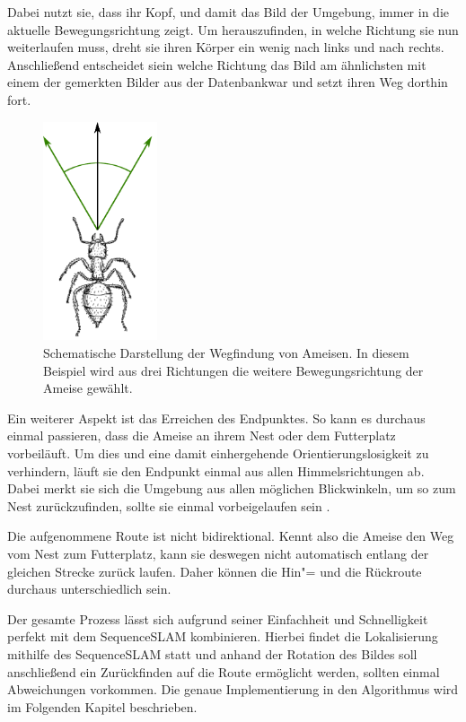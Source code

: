 \documentclass[12pt,a4paper,titlepage]{scrartcl}
\begin{document}
Dabei nutzt sie, dass ihr Kopf, und damit das Bild der Umgebung, immer in die aktuelle Bewegungsrichtung zeigt. Um herauszufinden, in welche Richtung sie nun weiterlaufen muss, dreht sie ihren Körper ein wenig nach links und nach rechts. Anschließend entscheidet siein welche Richtung das Bild am ähnlichsten mit einem der gemerkten Bilder aus der \glqq Datenbank\grqq{ }war und setzt ihren Weg dorthin fort. 
\begin{figure}[h!]
\centering
\includegraphics[width=0.3\textwidth]{../Bilder/blickwinkel_aenderung.pdf}
\caption[Wegfindung der Ameise]{Schematische Darstellung der Wegfindung von Ameisen. In diesem Beispiel wird aus drei Richtungen die weitere Bewegungsrichtung der Ameise gewählt.}
\label{img:Am_Blick}
\end{figure} 

Ein weiterer Aspekt ist das Erreichen des Endpunktes. So kann es durchaus einmal passieren, dass die Ameise an ihrem Nest oder dem Futterplatz vorbeiläuft. Um dies und eine damit einhergehende Orientierungslosigkeit zu verhindern, läuft sie den Endpunkt einmal aus allen Himmelsrichtungen ab. Dabei merkt sie sich die Umgebung aus allen möglichen Blickwinkeln, um so zum Nest zurückzufinden, sollte sie einmal vorbeigelaufen sein \cite{baddeley2012model}. 

Die aufgenommene Route ist nicht bidirektional. Kennt also die Ameise den Weg vom Nest zum Futterplatz, kann sie deswegen nicht automatisch entlang der gleichen Strecke zurück laufen. Daher können die Hin"= und die Rückroute durchaus unterschiedlich sein. 

Der gesamte Prozess lässt sich aufgrund seiner Einfachheit und Schnelligkeit perfekt mit dem SequenceSLAM kombinieren. Hierbei findet die Lokalisierung mithilfe des SequenceSLAM statt und anhand der Rotation des Bildes soll anschließend ein Zurückfinden auf die Route ermöglicht werden, sollten einmal Abweichungen vorkommen. Die genaue Implementierung in den Algorithmus wird im Folgenden Kapitel beschrieben.
\end{document}
